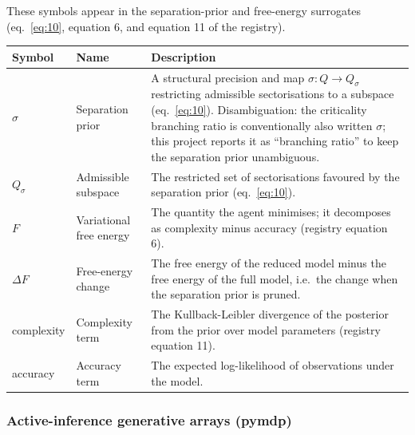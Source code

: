 \documentclass[
]{article}
\newcounter{none} %
\begin{document}
These symbols appear in the separation-prior and free-energy surrogates
(eq.~\ref{eq:10}, equation 6, and equation 11 of the registry).

{\def\LTcaptype{none} %
\begin{longtable}[]{@{}
  >{\raggedright\arraybackslash}p{}
  >{\raggedright\arraybackslash}p{}
  >{\raggedright\arraybackslash}p{}@{}}
\toprule\noalign{}
\begin{minipage}[b]{\linewidth}\raggedright
Symbol
\end{minipage} & \begin{minipage}[b]{\linewidth}\raggedright
Name
\end{minipage} & \begin{minipage}[b]{\linewidth}\raggedright
Description
\end{minipage} \\
\midrule\noalign{}
\endhead
\bottomrule\noalign{}
\endlastfoot
\(\sigma\) & Separation prior & A structural precision and map
\(\sigma: Q \rightarrow Q_{\sigma}\) restricting admissible
sectorisations to a subspace (eq.~\ref{eq:10}). Disambiguation: the
criticality branching ratio is conventionally also written \(\sigma\);
this project reports it as ``branching ratio'' to keep the separation
prior unambiguous. \\
\(Q_{\sigma}\) & Admissible subspace & The restricted set of
sectorisations favoured by the separation prior (eq.~\ref{eq:10}). \\
\(F\) & Variational free energy & The quantity the agent minimises; it
decomposes as complexity minus accuracy (registry equation 6). \\
\(\Delta F\) & Free-energy change & The free energy of the reduced model
minus the free energy of the full model, i.e.~the change when the
separation prior is pruned. \\
complexity & Complexity term & The Kullback-Leibler divergence of the
posterior from the prior over model parameters (registry equation
11). \\
accuracy & Accuracy term & The expected log-likelihood of observations
under the model. \\
\end{longtable}
}

\subsubsection{Active-inference generative arrays
(pymdp)}\label{active-inference-generative-arrays-pymdp}
\end{document}
